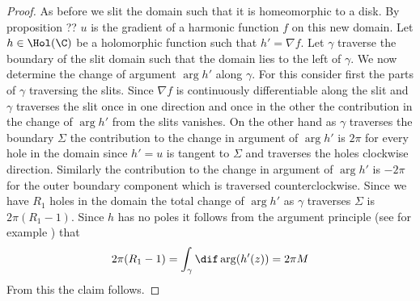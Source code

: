 \begin{proof}
  As before we slit the domain such that it is homeomorphic to a disk. By proposition ?? $u$ is the gradient of a
  harmonic function $f$ on this new domain. Let $h\in\Hol(\C)$ be a holomorphic function such that $h'=\nabla f$.
  Let $\gamma$ traverse the boundary of the slit domain such that the domain lies to the left of $\gamma$.
  We now determine the change of argument $\arg h'$ along $\gamma$. For this
  consider first the parts of $\gamma$ traversing the slits. Since $\nabla f$ is continuously differentiable
  along the slit and $\gamma$ traverses the slit once in one direction and once in the other 
  the contribution in the change of $\arg h'$ from the slits vanishes.
  On the other hand as $\gamma$ traverses the boundary $\Sigma$ the contribution to the change in
  argument of $\arg h'$ is $2\pi$ for every hole in the domain 
  since $h'=u$ is tangent to $\Sigma$ and traverses the holes clockwise direction.
  Similarly the contribution to the change in argument of $\arg h'$ is $-2\pi$ for the outer boundary component
  which is traversed counterclockwise.
  Since we have $R_1$ holes in the domain the total change of $\arg h'$ as $\gamma$ traverses $\Sigma$ is
  $2\pi(R_1-1)$.
  Since $h$ has no poles it follows from the argument principle (see for example \cite[Chapter VIII]{Gamelin2001}) that
  \begin{align}
    2\pi(R_1-1)=\int_\gamma\dif\arg (h'(z)) =  2\pi M
  \end{align}
  From this the claim follows.
\end{proof}

